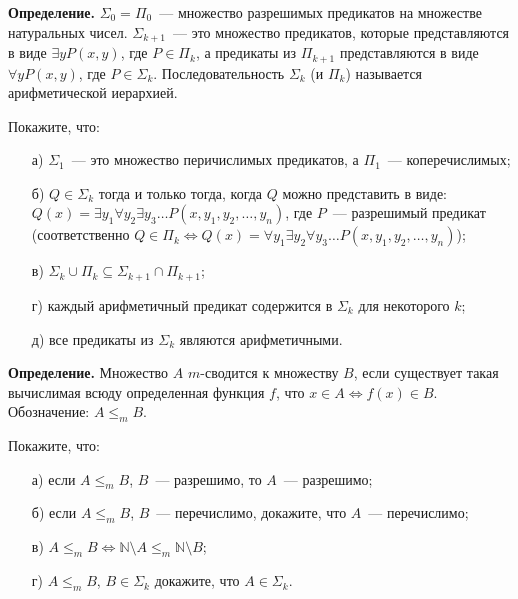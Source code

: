 

\textbf{Определение.} $\Sigma_0 = \Pi_0$~--- множество разрешимых предикатов на множестве натуральных чисел. $\Sigma_{k + 1}$~---
это множество предикатов, которые представляются в виде $\exists y P(x,y)$, где $P \in \Pi_{k}$, а предикаты из $\Pi_{k + 1}$
представляются в виде $\forall y P(x, y)$, где $P \in \Sigma_{k}$. Последовательность $\Sigma_k$ (и $\Pi_k$) называется
арифметической иерархией. 

\begin{task}
    Покажите, что:
    \begin{enumerate}[topsep = 0pt, itemsep = -1ex]
        \item [а)] $\Sigma_1$~--- это множество перичислимых предикатов, а $\Pi_1$~--- коперечислимых;
        \item [б)] $Q \in \Sigma_k$ тогда и только тогда, когда $Q$ можно представить в виде: $Q(x) = \exists y_1 \forall y_2
		    \exists y_3 \dots P(x, y_1, y_2, \dots, y_n)$, где $P$~--- разрешимый предикат (соответственно $Q \in \Pi_k
            \Leftrightarrow Q(x) = \forall y_1 \exists y_2 \forall y_3 \dots P(x, y_1, y_2, \dots, y_n)$);
        \item [в)] $\Sigma_k \cup \Pi_k \subseteq \Sigma_{k + 1} \cap \Pi_{k + 1}$;
        \item [г)] каждый арифметичный предикат содержится в $\Sigma_k$ для некоторого $k$;
    	\item [д)] все предикаты из $\Sigma_k$ являются арифметичными.
    \end{enumerate}
\end{task}



\textbf{Определение.} Множество $A$ $m$-сводится к множеству $B$, если существует такая вычислимая всюду определенная функция
$f$, что  $x \in A \Leftrightarrow f(x) \in B$. Обозначение: $A \le_m B$.

\begin{task}
    Покажите, что:
    \begin{enumerate}[topsep = 0pt, itemsep = -1ex]
        \item [а)] если $A {\le}_{m} B$, $B$~--- разрешимо, то $A$~--- разрешимо;
        \item [б)] если $A {\le}_{m} B$, $B$~--- перечислимо, докажите, что $A$~--- перечислимо;
        \item [в)] $A {\le}_{m} B \Leftrightarrow \mathbb{N} \setminus A \le_m \mathbb{N} \setminus B$;
        \item [г)] $A {\le}_{m} B$, $B \in \Sigma_k$ докажите, что $A \in \Sigma_k$.
    \end{enumerate}
\end{task}


